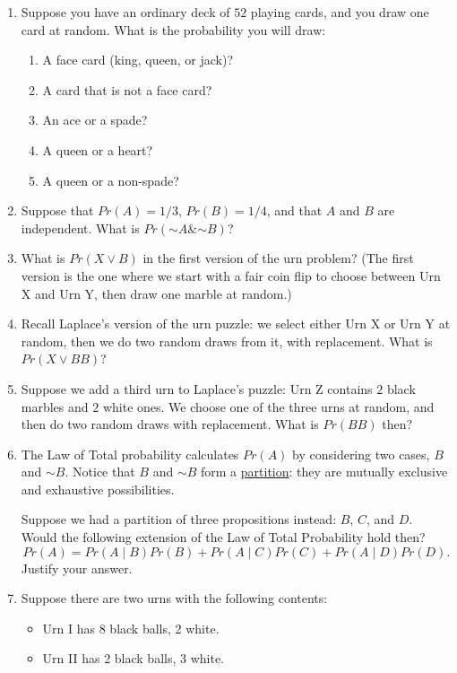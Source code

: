 \documentclass[justified]{tufte-book}
\providecommand{\tightlist}{%
  \setlength{\itemsep}{0pt}\setlength{\parskip}{0pt}}
\newcommand{\given}{\mid}
\renewcommand{\neg}{\mathbin{\sim}}
\renewcommand{\wedge}{\mathbin{\&}}
\newcommand{\p}{Pr}
\theoremstyle{definition}
\theoremstyle{definition}
\theoremstyle{definition}
\theoremstyle{remark}
\begin{document}
\begin{enumerate}
\item
  Suppose you have an ordinary deck of \(52\) playing cards, and you draw one card at random. What is the probability you will draw:

  \begin{enumerate}
  \def\labelenumii{\alph{enumii}.}
  \tightlist
  \item
    A face card (king, queen, or jack)?
  \item
    A card that is not a face card?
  \item
    An ace or a spade?
  \item
    A queen or a heart?
  \item
    A queen or a non-spade?
  \end{enumerate}
\item
  Suppose that \(Pr(A)=1/3\), \(Pr(B) = 1/4\), and that \(A\) and \(B\) are independent. What is \(\p(\neg A \wedge \neg B)\)?
\item
  What is \(\p(X \vee B)\) in the first version of the urn problem? (The first version is the one where we start with a fair coin flip to choose between Urn X and Urn Y, then draw one marble at random.)
\item
  Recall Laplace's version of the urn puzzle: we select either Urn X or Urn Y at random, then we do two random draws from it, with replacement. What is \(\p(X \vee BB)\)?
\item
  Suppose we add a third urn to Laplace's puzzle: Urn Z contains \(2\) black marbles and \(2\) white ones. We choose one of the three urns at random, and then do two random draws with replacement. What is \(\p(BB)\) then?
\item
  The Law of Total probability calculates \(\p(A)\) by considering two cases, \(B\) and \(\neg B\). Notice that \(B\) and \(\neg B\) form a \protect\hyperlink{lessons}{partition}: they are mutually exclusive and exhaustive possibilities.

  Suppose we had a partition of three propositions instead: \(B\), \(C\), and \(D\). Would the following extension of the Law of Total Probability hold then?
  \[\p(A) = \p(A \given B)\p(B) + \p(A \given C)\p(C) + \p(A \given D)\p(D).\]
  Justify your answer.
\item
  Suppose there are two urns with the following contents:

  \begin{itemize}
  \tightlist
  \item
    Urn I has 8 black balls, 2 white.
  \item
    Urn II has 2 black balls, 3 white.
  \end{itemize}


\end{enumerate}
\end{document}
